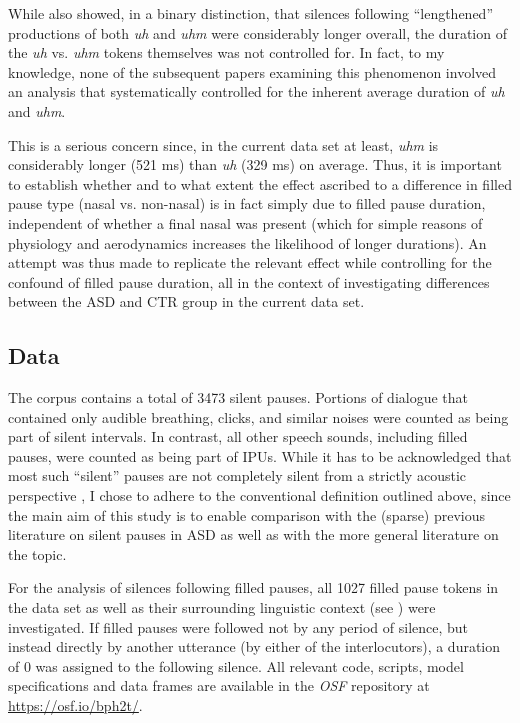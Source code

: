 While \citet{clarkUsingUhUm2002} also showed, in a binary distinction, that silences following “lengthened” productions of both \emph{uh} and \emph{uhm} were considerably longer overall, the duration of the \emph{uh} vs. \emph{uhm} tokens themselves was not controlled for. In fact, to my knowledge, none of the subsequent papers examining this phenomenon involved an analysis that systematically controlled for the inherent average duration of \emph{uh} and \emph{uhm}.

This is a serious concern since, in the current data set at least, \emph{uhm} is considerably longer (521 ms) than \emph{uh} (329 ms) on average. Thus, it is important to establish whether and to what extent the effect ascribed to a difference in filled pause type (nasal vs. non-nasal) is in fact simply due to filled pause duration, independent of whether a final nasal was present (which for simple reasons of physiology and aerodynamics increases the likelihood of longer durations). An attempt was thus made to replicate the relevant effect while controlling for the confound of filled pause duration, all in the context of investigating differences between the ASD and CTR group in the current data set.

\subsection{Data}\label{BCFP_FP_silent_data}

The corpus contains a total of 3473 silent pauses.
Portions of dialogue that contained only audible breathing, clicks, and similar noises were counted as being part of silent intervals. In contrast, all other speech sounds, including filled pauses, were counted as being part of IPUs. While it has to be acknowledged that most such ``silent” pauses are not completely silent from a strictly acoustic perspective \citep{belzAreSilentPauses2019}, I chose to adhere to the conventional definition outlined above, since the main aim of this study is to enable comparison with the (sparse) previous literature on silent pauses in ASD as well as with the more general literature on the topic.

For the analysis of silences following filled pauses, all 1027 filled pause tokens in the data set as well as their surrounding linguistic context (see ) were investigated. If filled pauses were followed not by any period of silence, but instead directly by another utterance (by either of the interlocutors), a duration of 0 was assigned to the following silence. All relevant code, scripts, model specifications and data frames are available in the \textit{OSF} repository at \url{https://osf.io/bph2t/}.

